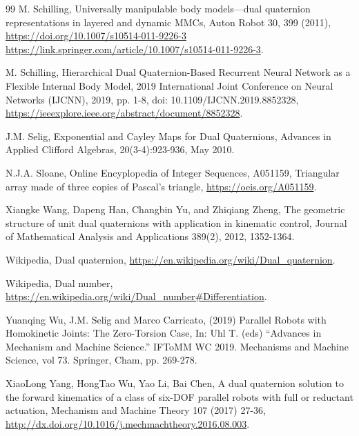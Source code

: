 \documentclass[12pt,reqno]{amsart}
\begin{document}
\begin{thebibliography}{99}
  M. Schilling, Universally manipulable body models---dual quaternion representations in layered and dynamic MMCs, Auton Robot 30, 399 (2011), \url{https://doi.org/10.1007/s10514-011-9226-3 https://link.springer.com/article/10.1007/s10514-011-9226-3}.

 M. Schilling, Hierarchical Dual Quaternion-Based Recurrent Neural Network as a Flexible Internal Body Model, 2019 International Joint Conference on Neural Networks (IJCNN), 2019, pp. 1-8, doi: 10.1109/IJCNN.2019.8852328, \url{https://ieeexplore.ieee.org/abstract/document/8852328}.

 J.M. Selig, Exponential and Cayley Maps for Dual Quaternions, Advances in Applied Clifford Algebras, 20(3-4):923-936, May 2010.

 N.J.A. Sloane, Online Encyplopedia of Integer Sequences, A051159, Triangular array made of three copies of Pascal's triangle, \url{https://oeis.org/A051159}.

 Xiangke Wang, Dapeng Han, Changbin Yu, and Zhiqiang Zheng, The geometric structure of unit dual quaternions with application in kinematic control, Journal of Mathematical Analysis and Applications 389(2), 2012, 1352-1364.

 Wikipedia, Dual quaternion, \url{https://en.wikipedia.org/wiki/Dual_quaternion}.

 Wikipedia, Dual number, \url{https://en.wikipedia.org/wiki/Dual_number#Differentiation}.

 Yuanqing Wu, J.M. Selig and Marco Carricato,  (2019) Parallel
Robots with Homokinetic Joints: The Zero-Torsion Case, In: Uhl T. (eds) ``Advances in Mechanism and Machine Science.'' IFToMM WC 2019. Mechanisms and Machine Science, vol 73. Springer, Cham, pp. 269-278.

 XiaoLong Yang, HongTao Wu, Yao Li, Bai Chen, A dual quaternion solution to the forward kinematics of a class of six-DOF parallel robots with full or reductant actuation, Mechanism and Machine Theory 107 (2017) 27-36, \url{http://dx.doi.org/10.1016/j.mechmachtheory.2016.08.003}.
\end{thebibliography}
\end{document}
